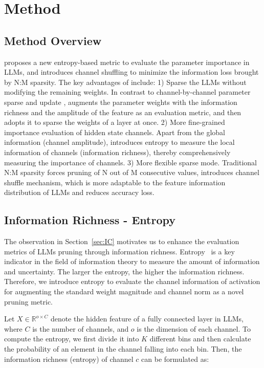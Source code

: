 \section{Method}

\subsection{Method Overview}

\name proposes a new entropy-based metric to evaluate the parameter importance in LLMs, and introduces channel shuffling to minimize the information loss brought by N:M sparsity. The key advantages of \name include: 
1) Sparse the LLMs without modifying the remaining weights. In contrast to channel-by-channel parameter sparse and update \cite{frantar2023massive}, \name augments the parameter weights with the information richness and the amplitude of the feature as an evaluation metric, and then adopts it to sparse the weights of a layer at once.
2) More fine-grained importance evaluation of hidden state channels. Apart from the global information (channel amplitude), \name introduces entropy to measure the local information of channels (information richness), thereby comprehensively measuring the importance of channels.
3) More flexible sparse mode. Traditional N:M sparsity forces pruning of N out of M consecutive values, \name introduces channel shuffle mechanism, which is more adaptable to the feature information distribution of LLMs and reduces accuracy loss.

\subsection{Information Richness - Entropy}

The observation in Section~\ref{sec:IC} motivates us to enhance the evaluation metrics of LLMs pruning through information richness. Entropy~\cite{shannon1948mathematical} is a key indicator in the field of information theory to measure the amount of information and uncertainty. 
The larger the entropy, the higher the information richness.
Therefore, we introduce entropy to evaluate the channel information of activation for augmenting the standard weight magnitude and channel norm as a novel pruning metric.

Let $X\in \mathbb{R}^{o\times C}$ denote the hidden feature of a fully connected layer in LLMs, where $C$ is the number of channels, and $o$ is the dimension of each channel. To compute the entropy, we first divide it into $K$ different bins and then calculate the probability of an element in the channel falling into each bin. Then, the information richness (entropy) of channel $c$ can be formulated as:

